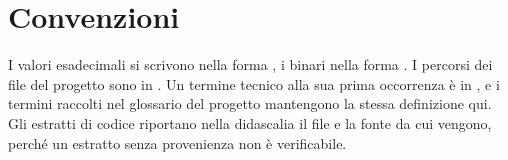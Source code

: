 \section*{Convenzioni}

I valori esadecimali si scrivono nella forma , i binari nella forma .
I percorsi dei file del progetto sono in . Un termine tecnico alla sua
prima occorrenza è in , e i termini raccolti nel glossario del progetto
mantengono la stessa definizione qui. Gli estratti di codice riportano nella didascalia
il file e la fonte da cui vengono, perché un estratto senza provenienza non è
verificabile.

